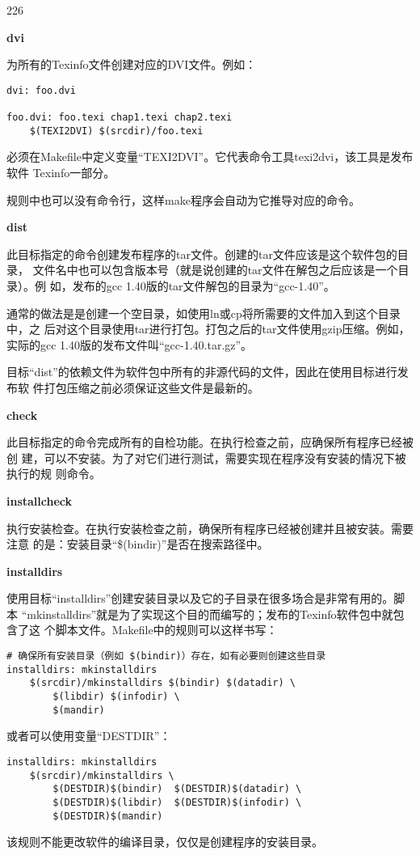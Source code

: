 \begin{dinglist}{226}
\item \textbf{dvi}

为所有的Texinfo文件创建对应的DVI文件。例如：

\begin{Verbatim}[]
dvi: foo.dvi

foo.dvi: foo.texi chap1.texi chap2.texi
    $(TEXI2DVI) $(srcdir)/foo.texi
\end{Verbatim}

必须在Makefile中定义变量“TEXI2DVI”。它代表命令工具texi2dvi，该工具是发布软件
Texinfo一部分。

规则中也可以没有命令行，这样make程序会自动为它推导对应的命令。

\item \textbf{dist}

此目标指定的命令创建发布程序的tar文件。创建的tar文件应该是这个软件包的目录，
文件名中也可以包含版本号（就是说创建的tar文件在解包之后应该是一个目录）。例
如，发布的gcc 1.40版的tar文件解包的目录为“gcc-1.40”。

通常的做法是是创建一个空目录，如使用ln或cp将所需要的文件加入到这个目录中，之
后对这个目录使用tar进行打包。打包之后的tar文件使用gzip压缩。例如，实际的gcc
1.40版的发布文件叫“gcc-1.40.tar.gz”。

目标“dist”的依赖文件为软件包中所有的非源代码的文件，因此在使用目标进行发布软
件打包压缩之前必须保证这些文件是最新的。


\item \textbf{check}

此目标指定的命令完成所有的自检功能。在执行检查之前，应确保所有程序已经被创
建，可以不安装。为了对它们进行测试，需要实现在程序没有安装的情况下被执行的规
则命令。

\item \textbf{installcheck}

执行安装检查。在执行安装检查之前，确保所有程序已经被创建并且被安装。需要注意
的是：安装目录“\$(bindir)”是否在搜索路径中。

\item \textbf{installdirs}

使用目标“installdirs”创建安装目录以及它的子目录在很多场合是非常有用的。脚本
“mkinstalldirs”就是为了实现这个目的而编写的；发布的Texinfo软件包中就包含了这
个脚本文件。Makefile中的规则可以这样书写：

\begin{Verbatim}[]
# 确保所有安装目录（例如 $(bindir)）存在，如有必要则创建这些目录
installdirs: mkinstalldirs
    $(srcdir)/mkinstalldirs $(bindir) $(datadir) \
        $(libdir) $(infodir) \
        $(mandir)
\end{Verbatim}

或者可以使用变量“DESTDIR”：

\begin{Verbatim}[]
installdirs: mkinstalldirs
    $(srcdir)/mkinstalldirs \
        $(DESTDIR)$(bindir)  $(DESTDIR)$(datadir) \
        $(DESTDIR)$(libdir)  $(DESTDIR)$(infodir) \
        $(DESTDIR)$(mandir)
\end{Verbatim}

该规则不能更改软件的编译目录，仅仅是创建程序的安装目录。

\end{dinglist}

